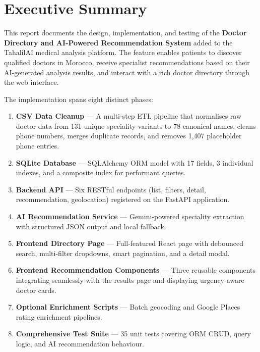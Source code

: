 \documentclass[12pt, a4paper]{article}
\begin{document}
\newpage
\tableofcontents
\newpage

\section{Executive Summary}

This report documents the design, implementation, and testing of the
\textbf{Doctor Directory and AI-Powered Recommendation System} added to the
TahalilAI medical analysis platform.
The feature enables patients to discover qualified doctors in Morocco,
receive specialist recommendations based on their AI-generated analysis
results, and interact with a rich doctor directory through the web interface.

The implementation spans eight distinct phases:

\begin{enumerate}[leftmargin=*, itemsep=4pt]
  \item \textbf{CSV Data Cleanup} — A multi-step ETL pipeline that normalises
        raw doctor data from 131 unique speciality variants to 78 canonical
        names, cleans phone numbers, merges duplicate records, and
        removes 1,407 placeholder phone entries.
  \item \textbf{SQLite Database} — SQLAlchemy ORM model with 17 fields,
        3 individual indexes, and a composite index for performant queries.
  \item \textbf{Backend API} — Six RESTful endpoints (list, filters, detail,
        recommendation, geolocation) registered on the FastAPI application.
  \item \textbf{AI Recommendation Service} — Gemini-powered speciality
        extraction with structured JSON output and local fallback.
  \item \textbf{Frontend Directory Page} — Full-featured React page with
        debounced search, multi-filter dropdowns, smart pagination,
        and a detail modal.
  \item \textbf{Frontend Recommendation Components} — Three reusable
        components integrating seamlessly with the results page and
        displaying urgency-aware doctor cards.
  \item \textbf{Optional Enrichment Scripts} — Batch geocoding and
        Google Places rating enrichment pipelines.
  \item \textbf{Comprehensive Test Suite} — 35 unit tests covering
        ORM CRUD, query logic, and AI recommendation behaviour.
\end{enumerate}
\end{document}
